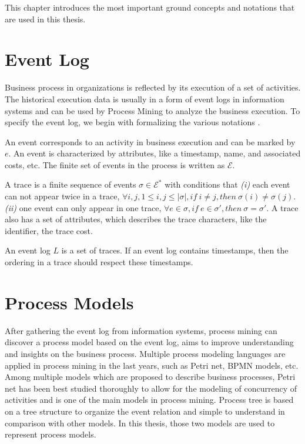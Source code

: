 This chapter introduces the most important ground concepts and notations that are used in this thesis. 
\section{Event Log}
Business process in organizations is reflected by its execution of a set of activities. The historical execution data is usually in a form of event logs in information systems and can be used by Process Mining to analyze the business execution. To specify the event log, we begin with formalizing the various notations\cite{van2016data} .
\begin{definition}[Event]
	An event corresponds to an activity in business execution and can be marked by $e$. An event is characterized by attributes, like a timestamp, name, and associated costs, etc. The finite set of events in the process is written as $\mathcal{E}$.
\end{definition}
\begin{definition}[Trace]
A trace is a finite sequence of events $\sigma \in \mathcal{E}^*$ with conditions that \emph{(i)} each event can not appear twice in a trace, $ \forall i,j, 1 \leq i,j \leq \vert \sigma \vert, if \ i \neq j, then\ \sigma (i) \neq \sigma (j) $.  \emph{(ii)} one event can only appear in one trace, $ \forall e \in \sigma, if\ e \in \sigma\prime, then\ \sigma = \sigma\prime $. 
A trace also has a set of attributes, which describes the trace characters, like the identifier, the trace cost.
\end{definition}
\begin{definition}
An event log $L$ is a set of traces. If an event log contains timestamps, then the ordering in a trace should respect these timestamps. 
\end{definition}
\section{Process Models}
After gathering the event log from information systems, process mining can discover a process model based on the event log, aims to improve understanding and insights on the business process. Multiple process modeling languages are applied in process mining in the last years, such as Petri net, BPMN models, etc. Among multiple models which are proposed to describe business processes, Petri net has been best studied thoroughly to allow for the modeling of concurrency of activities and is one of the main models in process mining. Process tree is based on a tree structure to organize the event relation and simple to understand in comparison with other models. In this thesis, those two models are used to represent process models.
